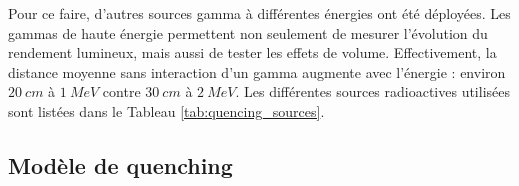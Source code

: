 Pour ce faire, d'autres sources gamma à différentes énergies ont été déployées. Les gammas de haute énergie permettent non seulement de mesurer l'évolution du rendement lumineux, mais aussi de tester les effets de volume. Effectivement, la distance moyenne sans interaction d'un gamma augmente avec l'énergie : environ $\SI{20}{cm}$ à $\SI{1}{MeV}$ contre $\SI{30}{cm}$ à $\SI{2}{MeV}$. Les différentes sources radioactives utilisées sont listées dans le Tableau \ref{tab:quencing_sources}.\\




\subsection{Modèle de quenching}

